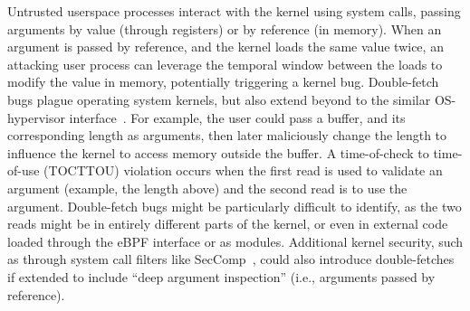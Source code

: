 Untrusted userspace processes interact with the kernel using system calls,
passing arguments by value (through registers) or by reference (in memory).
When an argument is passed by reference, and the kernel loads the same
value twice, an attacking user process can leverage the temporal window 
between the loads to modify the value in memory, potentially triggering a
kernel bug.
Double-fetch bugs plague operating system kernels, but also extend beyond
to the similar OS-hypervisor interface~\cite{cve201812633, cve202012652, 
cve20131332, cve201920610,cve20158550, cve201610439, cve201610435, 
cve201610433, cve20195519,cve20168438}.
For example, the user could pass a buffer, and its corresponding length
as arguments, then later maliciously change the length to influence the
kernel to access memory outside the buffer.
A time-of-check to time-of-use (TOCTTOU) violation occurs when the
first read is used to validate an argument (example, the length above)
and the second read is to use the argument.
Double-fetch bugs might be particularly difficult to identify, as the two
reads might be in entirely different parts of the kernel, or even in external
code loaded through the eBPF interface or as modules.
Additional kernel security, such as through system call filters like 
SecComp~\cite{seccomp}, could also introduce double-fetches if extended to
include ``deep argument inspection'' (i.e., arguments passed by reference).

